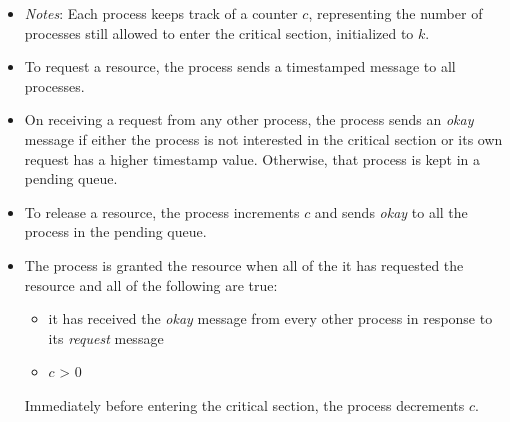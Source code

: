 \documentclass[11pt]{article}
\begin{document}
\begin{enumerate}
\begin{enumerate}[(a)]
\begin{itemize}
\item \emph{Notes}: Each process keeps track of a counter $c$, representing the number of processes still allowed to enter the critical section, initialized to $k$.
\item To request a resource, the process sends a timestamped message to all processes.
\item On receiving a request from any other process, the process sends an \emph{okay} message if either the process is not interested in the critical section or its own request has a higher timestamp value. Otherwise, that process is kept in a pending queue.
\item To release a resource, the process increments $c$ and sends \emph{okay} to all the process in the pending queue.
\item The process is granted the resource when all of the it has requested the resource and all of the following are true: 
\begin{itemize}
\item it has received the \emph{okay} message from every other process in response to its \emph{request} message
\item $c$ > 0
\end{itemize}
Immediately before entering the critical section, the process decrements $c$.
\end{itemize}

\end{enumerate}
\end{enumerate}
\end{document}
